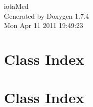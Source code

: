 \documentclass[a4paper]{book}
\begin{document}
\hypersetup{pageanchor=false}
\begin{titlepage}
\vspace*{7cm}
\begin{center}
{\Large iotaMed }\\
\vspace*{1cm}
{\large Generated by Doxygen 1.7.4}\\
\vspace*{0.5cm}
{\small Mon Apr 11 2011 19:49:23}\\
\end{center}
\end{titlepage}
\clearemptydoublepage
{}
\tableofcontents
\clearemptydoublepage
{}
\hypersetup{pageanchor=true}
\chapter{Class Index}

\chapter{Class Index}

\end{document}
